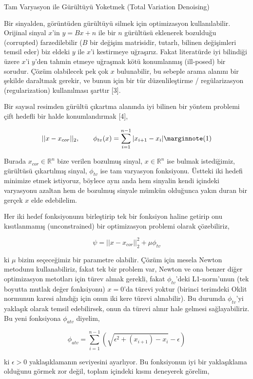 \documentclass[12pt,fleqn]{article}\usepackage{../../common}
\begin{document}
Tam Varyasyon ile Gürültüyü Yoketmek (Total Variation Denoising)

Bir sinyalden, görüntüden gürültüyü silmek için optimizasyon
kullanılabilir. Orijinal sinyal $x$'in $y = B x + n$ ile bir $n$ gürültüsü
eklenerek bozulduğu (corrupted) farzedilebilir ($B$ bir değişim matrisidir,
tutarlı, bilinen değişimleri temsil eder) biz eldeki $y$ ile $x$'i
kestirmeye uğraşırız.  Fakat literatürde iyi bilindiği üzere $x$'i $y$'den
tahmin etmeye uğraşmak kötü konumlanmış (ill-posed) bir sorudur. Çözüm
olabilecek pek çok $x$ bulunabilir, bu sebeple arama alanını bir şekilde
daraltmak gerekir, ve bunun için bir tür düzenlileştirme / regülarizasyon
(regularization) kullanılması şarttır [3].

Bir sayısal resimden gürültü çıkartma alanında iyi bilinen bir yöntem
problemi çift hedefli bir halde konumlandırmak [4],

$$
|| x-x_{cor}||_2, \qquad \phi_{tv} (x) = \sum_{i=1}^{n-1} | x_{i+1} - x_i | 
\mlabel{1}
$$

Burada $x_{cor} \in \mathbb{R}^n$ bize verilen bozulmuş sinyal,
$x \in \mathbb{R}^n$ ise bulmak istediğimiz, gürültüsü çıkartılmış sinyal,
$\phi_{tv}$ ise tam varyasyon fonksiyonu. Üstteki iki hedefi minimize etmek
istiyoruz, böylece aynı anda hem sinyalin kendi içindeki varyasyonu azaltan
hem de bozulmuş sinyale mümkün olduğunca yakın duran bir gerçek $x$ elde
edebilelim.

Her iki hedef fonksiyonunu birleştirip tek bir fonksiyon haline getirip onu
kısıtlanmamış (unconstrained) bir optimizasyon problemi olarak çözebiliriz,

$$
\psi = || x-x_{cor}||_2^2 + \mu \phi_{tv} 
$$

ki $\mu$ bizim seçeceğimiz bir parametre olabilir. Çözüm için mesela Newton
metodunu kullanabiliriz, fakat tek bir problem var, Newton ve ona benzer
diğer optimizasyon metotları için türev almak gerekli, fakat
$\phi_{tv}$'deki L1-norm'unun (tek boyutta mutlak değer fonksiyonu)
$x=0$'da türevi yoktur (birinci terimdeki Oklit normunun karesi alındığı
için onun iki kere türevi alınabilir). Bu durumda $\phi_{tv}$'yi yaklaşık
olarak temsil edebilirsek, onun da türevi alınır hale gelmesi
sağlayabiliriz. Bu yeni fonksiyona $\phi_{atv}$ diyelim,

$$
\phi_{atv} = \sum_{i=1}^{n-1} 
\left( \sqrt{ \epsilon^2 + (x_{i+1})-x_i  } - \epsilon \right)
$$

ki $\epsilon > 0$ yaklaşıklamanın seviyesini ayarlıyor. Bu fonksiyonun iyi
bir yaklaşıklama olduğunu görmek zor değil, toplam içindeki kısmı deneyerek
görelim,
\end{document}
